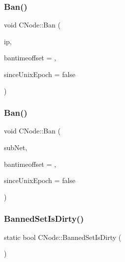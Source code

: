 \subsubsection{\texorpdfstring{Ban()}{Ban()}\hspace{0.1cm}{\footnotesize\ttfamily [1/2]}}
{\footnotesize\ttfamily void C\+Node\+::\+Ban (\begin{DoxyParamCaption}\item[{const \mbox{\hyperlink{class_c_net_addr}{C\+Net\+Addr}} \&}]{ip,  }\item[{int64\+\_\+t}]{bantimeoffset = {},  }\item[{bool}]{since\+Unix\+Epoch = {\ttfamily false} }\end{DoxyParamCaption})\hspace{0.3cm}{\ttfamily [static]}}

\mbox{\label{class_c_node_afc1f11ecdd142e458c7dcb9aa2b2e2db}} 
\subsubsection{\texorpdfstring{Ban()}{Ban()}\hspace{0.1cm}{\footnotesize\ttfamily [2/2]}}
{\footnotesize\ttfamily void C\+Node\+::\+Ban (\begin{DoxyParamCaption}\item[{const \mbox{\hyperlink{class_c_sub_net}{C\+Sub\+Net}} \&}]{sub\+Net,  }\item[{int64\+\_\+t}]{bantimeoffset = {},  }\item[{bool}]{since\+Unix\+Epoch = {\ttfamily false} }\end{DoxyParamCaption})\hspace{0.3cm}{\ttfamily [static]}}

\mbox{\label{class_c_node_a7c5a22808121ee7a57e46a73eff317c5}} 
\subsubsection{\texorpdfstring{Banned\+Set\+Is\+Dirty()}{BannedSetIsDirty()}}
{\footnotesize\ttfamily static bool C\+Node\+::\+Banned\+Set\+Is\+Dirty (\begin{DoxyParamCaption}{ }\end{DoxyParamCaption})\hspace{0.3cm}{\ttfamily [static]}}



